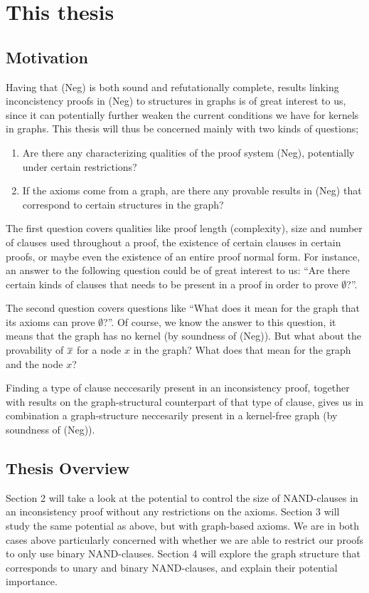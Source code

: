 \section{This thesis}
\label{sec:This thesis}
\subsection{Motivation}
\label{sub:Motivation}
Having that (Neg) is both sound and refutationally complete, results linking inconcistency proofs in (Neg) to structures in graphs is of great interest to us, since it can potentially further weaken the current conditions we have for kernels in graphs.
This thesis will thus be concerned mainly with two kinds of questions;
\begin{enumerate}
  \item Are there any characterizing qualities of the proof system (Neg), potentially under certain restrictions?
  \item If the axioms come from a graph, are there any provable results in (Neg) that correspond to certain structures in the graph?
\end{enumerate}
The first question covers qualities like proof length (complexity), size and number of clauses used throughout a proof, the existence of certain clauses in certain proofs, or maybe even the existence of an entire proof normal form.
For instance, an answer to the following question could be of great interest to us: ``Are there certain kinds of clauses that needs to be present in a proof in order to prove $\emptyset$?''.

The second question covers questions like ``What does it mean for the graph that its axioms can prove $\emptyset$?''.
Of course, we know the answer to this question, it means that the graph has no kernel (by soundness of (Neg)).
But what about the provability of $\overline{x}$ for a node $x$ in the graph?
What does that mean for the graph and the node $x$?

Finding a type of clause neccesarily present in an inconsistency proof, together with results on the graph-structural counterpart of that type of clause, gives us in combination a graph-structure neccesarily present in a kernel-free graph (by soundness of (Neg)).
\subsection{Thesis Overview}
\label{sub:Thesis Overview}
Section 2 will take a look at the potential to control the size of NAND-clauses in an inconsistency proof without any restrictions on the axioms.
Section 3 will study the same potential as above, but with graph-based axioms.
We are in both cases above particularly concerned with whether we are able to restrict our proofs to only use binary NAND-clauses.
Section 4 will explore the graph structure that corresponds to unary and binary NAND-clauses, and explain their potential importance.
